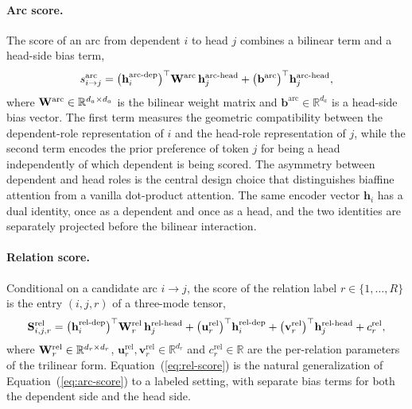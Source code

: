 \paragraph{Arc score.} The score of an arc from dependent $i$ to head $j$ combines a bilinear term and a head-side bias term,
\begin{equation}
\label{eq:arc-score}
s^{\text{arc}}_{i \rightarrow j} = \big(\mathbf{h}^{\text{arc-dep}}_i\big)^\top \mathbf{W}^{\text{arc}} \, \mathbf{h}^{\text{arc-head}}_j + \big(\mathbf{b}^{\text{arc}}\big)^\top \mathbf{h}^{\text{arc-head}}_j,
\end{equation}
where $\mathbf{W}^{\text{arc}} \in \mathbb{R}^{d_a \times d_a}$ is the bilinear weight matrix and $\mathbf{b}^{\text{arc}} \in \mathbb{R}^{d_a}$ is a head-side bias vector. The first term measures the geometric compatibility between the dependent-role representation of $i$ and the head-role representation of $j$, while the second term encodes the prior preference of token $j$ for being a head independently of which dependent is being scored. The asymmetry between dependent and head roles is the central design choice that distinguishes biaffine attention from a vanilla dot-product attention. The same encoder vector $\mathbf{h}_i$ has a dual identity, once as a dependent and once as a head, and the two identities are separately projected before the bilinear interaction.

\paragraph{Relation score.} Conditional on a candidate arc $i \rightarrow j$, the score of the relation label $r \in \{1, \ldots, R\}$ is the entry $(i, j, r)$ of a three-mode tensor,
\begin{equation}
\label{eq:rel-score}
\mathbf{S}^{\text{rel}}_{i,j,r} = \big(\mathbf{h}^{\text{rel-dep}}_i\big)^\top \mathbf{W}^{\text{rel}}_r \, \mathbf{h}^{\text{rel-head}}_j + \big(\mathbf{u}^{\text{rel}}_r\big)^\top \mathbf{h}^{\text{rel-dep}}_i + \big(\mathbf{v}^{\text{rel}}_r\big)^\top \mathbf{h}^{\text{rel-head}}_j + c^{\text{rel}}_r,
\end{equation}
where $\mathbf{W}^{\text{rel}}_r \in \mathbb{R}^{d_r \times d_r}$, $\mathbf{u}^{\text{rel}}_r, \mathbf{v}^{\text{rel}}_r \in \mathbb{R}^{d_r}$ and $c^{\text{rel}}_r \in \mathbb{R}$ are the per-relation parameters of the trilinear form. Equation~(\ref{eq:rel-score}) is the natural generalization of Equation~(\ref{eq:arc-score}) to a labeled setting, with separate bias terms for both the dependent side and the head side.

